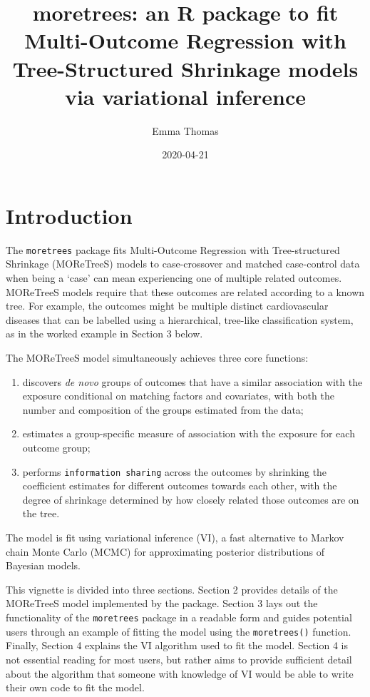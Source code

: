 \documentclass[]{article}
\title{moretrees: an R package to fit Multi-Outcome Regression with
Tree-Structured Shrinkage models via variational inference}
\author{Emma Thomas}
\date{2020-04-21}
\providecommand{\tightlist}{%
  \setlength{\itemsep}{0pt}\setlength{\parskip}{0pt}}
\begin{document}
\maketitle

\hypertarget{intro}{%
\section{Introduction}\label{intro}}

The \texttt{moretrees} package fits Multi-Outcome Regression with
Tree-structured Shrinkage (MOReTreeS) models to case-crossover and
matched case-control data when being a `case' can mean experiencing one
of multiple related outcomes. MOReTreeS models require that these
outcomes are related according to a known tree. For example, the
outcomes might be multiple distinct cardiovascular diseases that can be
labelled using a hierarchical, tree-like classification system, as in
the worked example in Section 3 below.

The MOReTreeS model simultaneously achieves three core functions:

\begin{enumerate}
\def\labelenumi{\arabic{enumi}.}
\tightlist
\item
  discovers \emph{de novo} groups of outcomes that have a similar
  association with the exposure conditional on matching factors and
  covariates, with both the number and composition of the groups
  estimated from the data;
\item
  estimates a group-specific measure of association with the exposure
  for each outcome group;
\item
  performs \texttt{information\ sharing} across the outcomes by
  shrinking the coefficient estimates for different outcomes towards
  each other, with the degree of shrinkage determined by how closely
  related those outcomes are on the tree.
\end{enumerate}

The model is fit using variational inference (VI), a fast alternative to
Markov chain Monte Carlo (MCMC) for approximating posterior
distributions of Bayesian models.

This vignette is divided into three sections. Section 2 provides details
of the MOReTreeS model implemented by the package. Section 3 lays out
the functionality of the \texttt{moretrees} package in a readable form
and guides potential users through an example of fitting the model using
the \texttt{moretrees()} function. Finally, Section 4 explains the VI
algorithm used to fit the model. Section 4 is not essential reading for
most users, but rather aims to provide sufficient detail about the
algorithm that someone with knowledge of VI would be able to write their
own code to fit the model.
\end{document}
